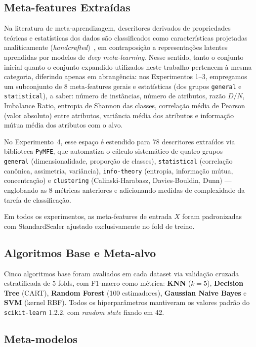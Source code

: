 \documentclass[12pt]{article}
\begin{document}
\subsection{Meta-features Extraídas}

Na literatura de meta-aprendizagem, descritores derivados de propriedades teóricas e estatísticas dos dados são classificados como características projetadas analiticamente (\textit{handcrafted})~\cite{pymfe2020}, em contraposição a representações latentes aprendidas por modelos de \textit{deep meta-learning}. Nesse sentido, tanto o conjunto inicial quanto o conjunto expandido utilizados neste trabalho pertencem à mesma categoria, diferindo apenas em abrangência: nos Experimentos 1--3, empregamos um subconjunto de 8 meta-features gerais e estatísticas (dos grupos \texttt{general} e \texttt{statistical}), a saber: número de instâncias, número de atributos, razão $D/N$, Imbalance Ratio, entropia de Shannon das classes, correlação média de Pearson (valor absoluto) entre atributos, variância média dos atributos e informação mútua média dos atributos com o alvo.

No Experimento~4, esse espaço é estendido para 78 descritores extraídos via biblioteca \texttt{PyMFE}, que automatiza o cálculo sistemático de quatro grupos --- \texttt{general} (dimensionalidade, proporção de classes), \texttt{statistical} (correlação canônica, assimetria, variância), \texttt{info-theory} (entropia, informação mútua, concentração) e \texttt{clustering} (Calinski-Harabasz, Davies-Bouldin, Dunn) --- englobando as 8 métricas anteriores e adicionando medidas de complexidade da tarefa de classificação.

Em todos os experimentos, as meta-features de entrada $X$ foram padronizadas com StandardScaler ajustado exclusivamente no fold de treino.

\subsection{Algoritmos Base e Meta-alvo}

Cinco algoritmos base foram avaliados em cada dataset via validação cruzada estratificada de 5 folds, com F1-macro como métrica: \textbf{KNN} ($k=5$), \textbf{Decision Tree} (CART), \textbf{Random Forest} (100 estimadores), \textbf{Gaussian Naive Bayes} e \textbf{SVM} (kernel RBF). Todos os hiperparâmetros mantiveram os valores padrão do \texttt{scikit-learn} 1.2.2, com \textit{random state} fixado em 42.

\subsection{Meta-modelos}
\end{document}
